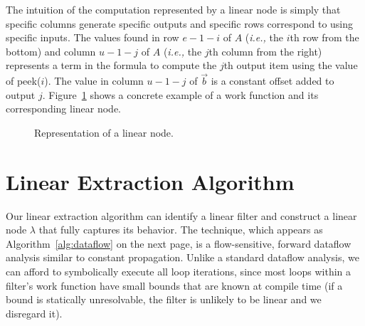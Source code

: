 \documentclass{sig-alternate}
\begin{document}

The intuition of the computation represented by a linear node is
simply that specific columns generate specific outputs and specific
rows correspond to using specific inputs.  The values found in row
$e-1-i$ of $A$ ({\it i.e.,} the $i$th row from the bottom) and 
column $u-1-j$ of $A$ ({\it i.e.,} the $j$th column from the right) 
represents a term in the formula to compute the $j$th output item using 
the value of peek($i$). The value in column $u-1-j$ of 
$\vec{b}$ is a constant offset added to output $j$.
Figure~\ref{fig:linear-node-example} shows a concrete example
of a work function and its corresponding linear node.

\begin{figure}
\center
\epsfxsize=2.9in
\vspace{-8pt}
\caption{Representation of a linear node.}
\vspace{-4pt}
\makeline
\vspace{-8pt}
\label{fig:linear-node-example}
\end{figure}

\newcommand{\la}{$\leftarrow$}
\newcommand{\IND}{\begin{ALC@g}}
\newcommand{\UND}{\end{ALC@g}}
\newcommand{\tup}[2]{\langle{#1}, {#2}\rangle}

\section{Linear Extraction Algorithm}
\label{sec:dataflow}

Our linear extraction algorithm can identify a linear filter and
construct a linear node $\lambda$ that fully captures its behavior.
The technique, which appears as Algorithm~\ref{alg:dataflow} on the
next page, is a flow-sensitive, forward dataflow analysis similar to
constant propagation.  Unlike a standard dataflow analysis, we can
afford to symbolically execute all loop iterations, since most loops
within a filter's work function have small bounds that are known at
compile time (if a bound is statically unresolvable, the filter is
unlikely to be linear and we disregard it).
\end{document}
